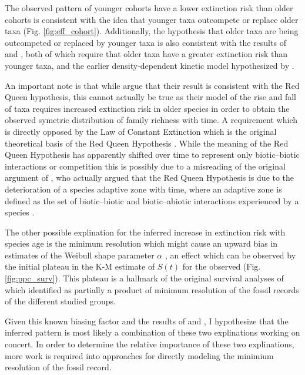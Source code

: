 \documentclass[12pt,letterpaper]{article}
\begin{document}
The observed pattern of younger cohorts have a lower extinction risk than older cohorts is consistent with the idea that younger taxa outcompete or replace older taxa (Fig. \ref{fig:eff_cohort}). Additionally, the hypothesis that older taxa are being outcompeted or replaced by younger taxa is also consistent with the results of \citet{Wagner2014b} and \citet{Quental2013}, both of which require that older taxa have a greater extinction risk than younger taxa, and the earlier density-dependent kinetic model hypothesized by \citet*{Sepkoski1978,Sepkoski1979,Sepkoski1984}.

An important note is that while \citet{Quental2013} argue that their result is consistent with the Red Queen hypothesis, this cannot actually be true as their model of the rise and fall of taxa requires increased extinction risk in older species in order to obtain the observed symetric distribution of family richness with time. A requirement which is directly opposed by the Law of Constant Extinction which is the original theoretical basis of the Red Queen Hypothesis \citep{VanValen1973}. While the meaning of the Red Queen Hypothesis has apparently shifted over time to represent only biotic--biotic interactions or competition \citep{Barnosky2001a} this is possibly due to a misreading of the original argument of \citet{VanValen1973}, who actually argued that the Red Queen Hypothesis is due to the deterioration of a species adaptive zone with time, where an adaptive zone is defined as the set of biotic--biotic and biotic--abiotic interactions experienced by a species \citep{Simpson1944,Liow2011a}.


The other possible explination for the inferred increase in extinction risk with species age is the minimum resolution which might cause an upward bias in estimates of the Weibull shape parameter \(\alpha\) \citep{Sepkoski1975}, an effect which can be observed by the initial plateau in the K-M estimate of \(S(t)\) for the observed (Fig. \ref{fig:ppc_surv}). This plateau is a hallmark of the original survival analyses of \citet{VanValen1973} which \citet{Sepkoski1975} identified as partially a product of minimum resolution of the fossil records of the different studied groups.

Given this known biasing factor and the results of \citet{Wagner2014b} and \citet{Quental2013}, I hypothesize that the inferred pattern is most likely a combination of these two explinations working on concert. In order to determine the relative importance of these two explinations, more work is required into approaches for directly modeling the minimium resolution of the fossil record.
\end{document}
